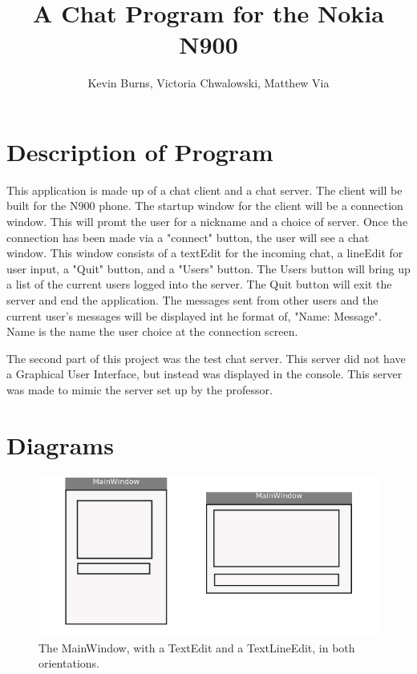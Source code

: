 \documentclass[12pt]{article}
\begin{document}
\title{A Chat Program for the Nokia N900}
\author{Kevin Burns, Victoria Chwalowski, Matthew Via}
\date{}
\maketitle

\section{Description of Program}

This application is made up of a chat client and a chat server. The client will be built for the N900 phone. The startup window for the client will be a connection window. This will promt the user for a nickname and a choice of server. Once the connection has been made via a "connect" button, the user will see a chat window. This window consists of a textEdit for the incoming chat, a lineEdit for user input, a "Quit" button, and a "Users" button.  The Users button will bring up a list of the current users logged into the server. The Quit button will exit the server and end the application. The messages sent from other users and the current user's messages will be displayed int he format of, "Name: Message". Name is the name the user choice at the connection screen. 

The second part of this project was the test chat server. This server did not have a Graphical User Interface, but instead was displayed in the console. This server was made to mimic the server set up by the professor.


\section{Diagrams}
\begin{figure}[H]
  \centering
 	\includegraphics{Figure1.png}   
  \caption{The MainWindow, with a TextEdit and a TextLineEdit, in both
  orientations.}
\end{figure}
\end{document}
